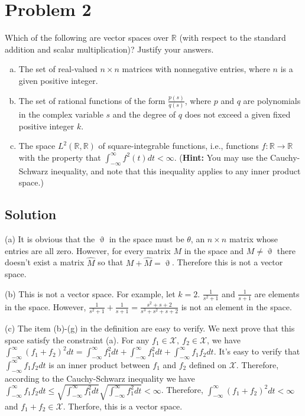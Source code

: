 \documentclass[11pt]{report}
\theoremstyle{definition}
\begin{document}
\section*{Problem 2}
Which of the following are vector spaces over $\mathbb{R}$ (with respect to the standard addition and scalar multiplication)? Justify your answers.

\begin{enumerate}[(a), noitemsep]
	\item The set of real-valued $n\times n$ matrices with nonnegative entries, where $n$ is a given positive integer.
	\item The set of rational functions of the form $\frac{p(s)}{q(s)}$, where $p$ and $q$ are polynomials in the complex variable $s$ and the degree of $q$ does not exceed a given fixed positive integer $k$.
	\item The space $L^2(\mathbb{R},\mathbb{R})$ of square-integrable functions, i.e., functions $f:\mathbb{R}\to\mathbb{R}$ with the property that $\int_{-\infty}^{\infty}f^2(t)dt<\infty$. ({\bf Hint: } You may use the Cauchy-Schwarz inequality, and note that this inequality applies to any inner product space.)
\end{enumerate}
\subsection*{Solution}

\noindent(a) It is obvious that the $\upvartheta$ in the space must be $\theta$, an $n \times n$ matrix whose entries are all zero. However, for every matrix $M$ in the space and $M \neq \upvartheta$ there doesn't exist a matrix $\hat{M}$ so that $M + \hat{M} = \upvartheta$. Therefore this is not a vector space.

\noindent(b) This is not a vector space. For example, let $k=2$. $\frac{1}{s^2+1}$ and $\frac{1}{s+1}$ are elements in the space. However, $\frac{1}{s^2+1} + \frac{1}{s+1} = \frac{s^2+s+2}{s^3+s^2+s+2}$ is not an element in the space.

\noindent(c) The item (b)-(g) in the definition are easy to verify. We next prove that this space satisfy the constraint (a). For any $f_1 \in \mathcal{X},~f_2 \in \mathcal{X}$, we have $\int_{-\infty}^{\infty}(f_1+f_2)^2 dt = \int_{-\infty}^{\infty}f_1^2 dt + \int_{-\infty}^{\infty}f_1^2 dt + \int_{-\infty}^{\infty}f_1f_2 dt$. It's easy to verify that $\int_{-\infty}^{\infty}f_1f_2 dt$ is an inner product between $f_1$ and $f_2$ defined on $\mathcal{X}$. Therefore, according to the Cauchy-Schwarz inequality we have $\int_{-\infty}^{\infty}f_1f_2 dt \le \sqrt{\int_{-\infty}^{\infty}f_1^2 dt}\sqrt{\int_{-\infty}^{\infty}f_1^2 dt} < \infty$. Therefore, $\int_{-\infty}^{\infty}(f_1+f_2)^2 dt < \infty$ and $f_1+f_2 \in \mathcal{X}$. Therfore, this is a vector space.
\end{document}
